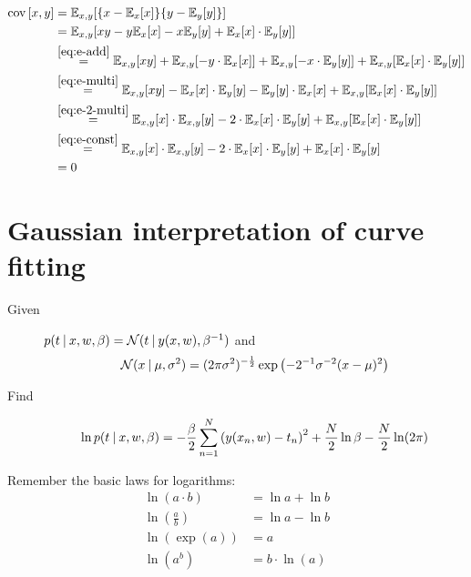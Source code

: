 \documentclass[a4paper]{article}
\newcommand\E{\mathbb{E}}
\newcommand\N{\mathcal{N}}
\DeclareMathOperator\cov{cov}
\newcommand\given{
  \nonscript\:
  \vert
  \nonscript\:
  \mathopen{}
  \allowbreak
}
\begin{document}
\begin{align*}
  \cov{[x,y]}
    &= \E_{x,y}[\{x - \E_{x}[x]\}\{y - \E_{y}[y]\}] \\
    &= \E_{x,y}[xy - y\E_x[x] - x\E_y[y] + \E_x[x] \cdot \E_y[y]] \\
    &\overset{\eqref{eq:e-add}}{=} \E_{x,y}[xy] + \E_{x,y}[-y \cdot \E_x[x]] + \E_{x,y}[-x \cdot \E_y[y]] + \E_{x,y}[\E_x[x] \cdot \E_y[y]] \\
    &\overset{\eqref{eq:e-multi}}{=} \E_{x,y}[xy] - \E_x[x] \cdot \E_{y}[y] - \E_{y}[y] \cdot \E_{x}[x] + \E_{x,y}[\E_x[x] \cdot \E_y[y]] \\
    &\overset{\eqref{eq:e-2-multi}}{=} \E_{x,y}[x] \cdot \E_{x,y}[y] - 2 \cdot \E_x[x] \cdot \E_{y}[y] + \E_{x,y}[\E_x[x] \cdot \E_y[y]] \\
    &\overset{\eqref{eq:e-const}}{=} \E_{x,y}[x] \cdot \E_{x,y}[y] - 2 \cdot \E_x[x] \cdot \E_{y}[y] + \E_x[x] \cdot \E_y[y] \\
    &= 0
\end{align*}

\section{Gaussian interpretation of curve fitting}

\begin{description}
  \item[Given] $p(t \given x,w,\beta) = \N(t \given y(x,w), \beta^{-1})$ and
    \[ \N(x \given \mu, \sigma^2) = (2 \pi \sigma^2)^{-\frac12} \exp\left(-2^{-1} \sigma^{-2} (x - \mu)^2\right) \]
  \item[Find]
    \[ \ln{p(t \given x,w,\beta)} = -\frac{\beta}{2} \sum_{n=1}^N \left(y(x_n,w) - t_n\right)^2 + \frac{N}{2} \ln\beta - \frac{N}{2} \ln(2\pi) \]
\end{description}

Remember the basic laws for logarithms:
\begin{align}
  \ln(a \cdot b) &= \ln{a} + \ln{b}              \label{eq:ln-multi} \\
  \ln\left(\frac{a}{b}\right) &= \ln{a} - \ln{b} \label{eq:ln-div} \\
  \ln(\exp(a)) &= a                              \label{eq:ln-inv} \\
  \ln(a^b) &= b \cdot \ln(a)                     \label{eq:ln-power}
\end{align}
\end{document}
